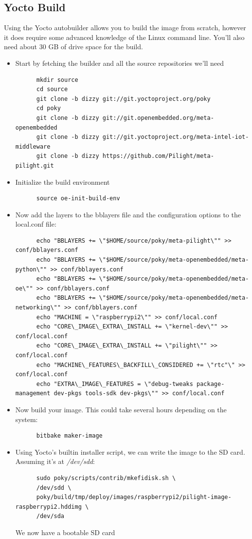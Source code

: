 \subsection{Yocto Build}
Using the Yocto autobuilder allows you to build the image from scratch, however it does require some advanced knowledge of the Linux command line. You'll also need about 30 GB of drive space for the build.
\begin{itemize}
   \item Start by fetching the builder and all the source repositories we'll need
      \begin{lstlisting}
      mkdir source
      cd source
      git clone -b dizzy git://git.yoctoproject.org/poky
      cd poky
      git clone -b dizzy git://git.openembedded.org/meta-openembedded
      git clone -b dizzy git://git.yoctoproject.org/meta-intel-iot-middleware
      git clone -b dizzy https://github.com/Pilight/meta-pilight.git
      \end{lstlisting}
   \item Initialize the build environment
      \begin{lstlisting}
      source oe-init-build-env
      \end{lstlisting}
   \item Now add the layers to the bblayers file and the configuration options to the local.conf file:
      \begin{lstlisting}
      echo "BBLAYERS += \"$HOME/source/poky/meta-pilight\"" >> conf/bblayers.conf
      echo "BBLAYERS += \"$HOME/source/poky/meta-openembedded/meta-python\"" >> conf/bblayers.conf
      echo "BBLAYERS += \"$HOME/source/poky/meta-openembedded/meta-oe\"" >> conf/bblayers.conf
      echo "BBLAYERS += \"$HOME/source/poky/meta-openembedded/meta-networking\"" >> conf/bblayers.conf
      echo "MACHINE = \"raspberrypi2\"" >> conf/local.conf
      echo "CORE\_IMAGE\_EXTRA\_INSTALL += \"kernel-dev\"" >> conf/local.conf
      echo "CORE\_IMAGE\_EXTRA\_INSTALL += \"pilight\"" >> conf/local.conf
      echo "MACHINE\_FEATURES\_BACKFILL\_CONSIDERED += \"rtc"\" >> conf/local.conf
      echo "EXTRA\_IMAGE\_FEATURES = \"debug-tweaks package-management dev-pkgs tools-sdk dev-pkgs\"" >> conf/local.conf
      \end{lstlisting}
   \item Now build your image. This could take several hours depending on the system:
      \begin{lstlisting}
      bitbake maker-image
      \end{lstlisting}
   \item Using Yocto's builtin installer script, we can write the image to the SD card. Assuming it's at \textit{/dev/sdd}:
      \begin{lstlisting}
      sudo poky/scripts/contrib/mkefidisk.sh \
      /dev/sdd \
      poky/build/tmp/deploy/images/raspberrypi2/pilight-image-raspberrypi2.hddimg \
      /dev/sda
      \end{lstlisting}
      We now have a bootable SD card
\end{itemize}
